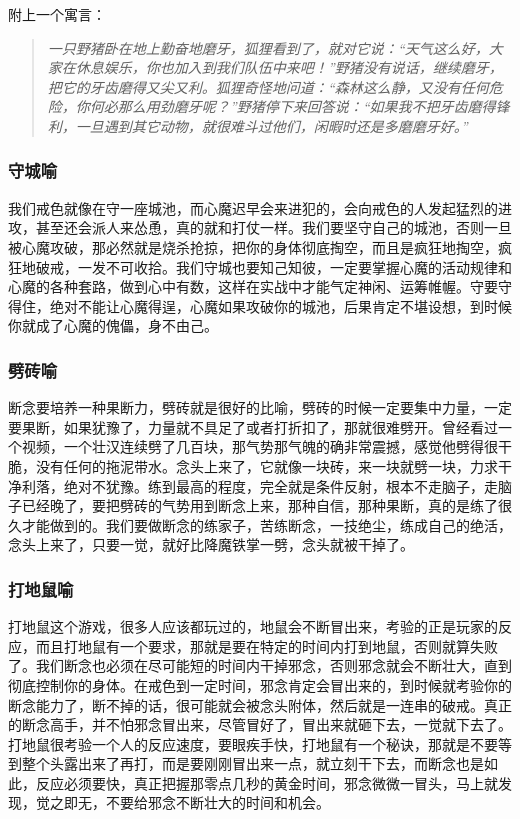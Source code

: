 附上一个寓言：

\begin{quote}\it
    一只野猪卧在地上勤奋地磨牙，狐狸看到了，就对它说：“天气这么好，大家在休息娱乐，你也加入到我们队伍中来吧！”野猪没有说话，继续磨牙，把它的牙齿磨得又尖又利。狐狸奇怪地问道：“森林这么静，又没有任何危险，你何必那么用劲磨牙呢？”野猪停下来回答说：“如果我不把牙齿磨得锋利，一旦遇到其它动物，就很难斗过他们，闲暇时还是多磨磨牙好。”
\end{quote}


\subsubsection{守城喻}

我们戒色就像在守一座城池，而心魔迟早会来进犯的，会向戒色的人发起猛烈的进攻，甚至还会派人来怂恿，真的就和打仗一样。我们要坚守自己的城池，否则一旦被心魔攻破，那必然就是烧杀抢掠，把你的身体彻底掏空，而且是疯狂地掏空，疯狂地破戒，一发不可收拾。我们守城也要知己知彼，一定要掌握心魔的活动规律和心魔的各种套路，做到心中有数，这样在实战中才能气定神闲、运筹帷幄。守要守得住，绝对不能让心魔得逞，心魔如果攻破你的城池，后果肯定不堪设想，到时候你就成了心魔的傀儡，身不由己。

\subsubsection{劈砖喻}

断念要培养一种果断力，劈砖就是很好的比喻，劈砖的时候一定要集中力量，一定要果断，如果犹豫了，力量就不具足了或者打折扣了，那就很难劈开。曾经看过一个视频，一个壮汉连续劈了几百块，那气势那气魄的确非常震撼，感觉他劈得很干脆，没有任何的拖泥带水。念头上来了，它就像一块砖，来一块就劈一块，力求干净利落，绝对不犹豫。练到最高的程度，完全就是条件反射，根本不走脑子，走脑子已经晚了，要把劈砖的气势用到断念上来，那种自信，那种果断，真的是练了很久才能做到的。我们要做断念的练家子，苦练断念，一技绝尘，练成自己的绝活，念头上来了，只要一觉，就好比降魔铁掌一劈，念头就被干掉了。

\subsubsection{打地鼠喻}

打地鼠这个游戏，很多人应该都玩过的，地鼠会不断冒出来，考验的正是玩家的反应，而且打地鼠有一个要求，那就是要在特定的时间内打到地鼠，否则就算失败了。我们断念也必须在尽可能短的时间内干掉邪念，否则邪念就会不断壮大，直到彻底控制你的身体。在戒色到一定时间，邪念肯定会冒出来的，到时候就考验你的断念能力了，断不掉的话，很可能就会被念头附体，然后就是一连串的破戒。真正的断念高手，并不怕邪念冒出来，尽管冒好了，冒出来就砸下去，一觉就下去了。打地鼠很考验一个人的反应速度，要眼疾手快，打地鼠有一个秘诀，那就是不要等到整个头露出来了再打，而是要刚刚冒出来一点，就立刻干下去，而断念也是如此，反应必须要快，真正把握那零点几秒的黄金时间，邪念微微一冒头，马上就发现，觉之即无，不要给邪念不断壮大的时间和机会。

